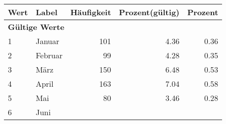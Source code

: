      \begin{longtable}{lXrrr}
     \toprule
     \textbf{Wert} & \textbf{Label} & \textbf{Häufigkeit} & \textbf{Prozent(gültig)} & \textbf{Prozent} \\
     \endhead
     \midrule
     \multicolumn{5}{l}{\textbf{Gültige Werte}}\\

     1 &
     \multicolumn{1}{X}{ Januar   } &


       \num{101} &
       \num[round-mode=places,round-precision=2]{4,36} &
         \num[round-mode=places,round-precision=2]{0,36} \\

     2 &
     \multicolumn{1}{X}{ Februar   } &


       \num{99} &
       \num[round-mode=places,round-precision=2]{4,28} &
         \num[round-mode=places,round-precision=2]{0,35} \\

     3 &
     \multicolumn{1}{X}{ März   } &


       \num{150} &
       \num[round-mode=places,round-precision=2]{6,48} &
         \num[round-mode=places,round-precision=2]{0,53} \\

     4 &
     \multicolumn{1}{X}{ April   } &


       \num{163} &
       \num[round-mode=places,round-precision=2]{7,04} &
         \num[round-mode=places,round-precision=2]{0,58} \\

     5 &
     \multicolumn{1}{X}{ Mai   } &


       \num{80} &
       \num[round-mode=places,round-precision=2]{3,46} &
         \num[round-mode=places,round-precision=2]{0,28} \\

     6 &
     \multicolumn{1}{X}{ Juni   } &



\end{longtable}
